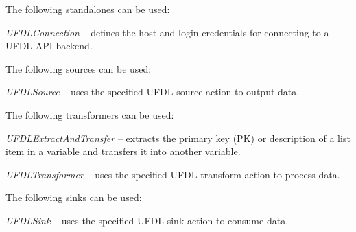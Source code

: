 \documentclass[a4paper]{book}
\begin{document}
\noindent The following standalones can be used:
\begin{tight_itemize}
  \item \textit{UFDLConnection} -- defines the host and login credentials for
  connecting to a UFDL API backend.
\end{tight_itemize}
The following sources can be used:
\begin{tight_itemize}
  \item \textit{UFDLSource} -- uses the specified UFDL source action to output data.
\end{tight_itemize}
The following transformers can be used:
\begin{tight_itemize}
  \item \textit{UFDLExtractAndTransfer} -- extracts the primary key (PK) or description of a list item
  in a variable and transfers it into another variable.
  \item \textit{UFDLTransformer} -- uses the specified UFDL transform action to process data.
\end{tight_itemize}
The following sinks can be used:
\begin{tight_itemize}
  \item \textit{UFDLSink} -- uses the specified UFDL sink action to consume data.
\end{tight_itemize}
\end{document}
